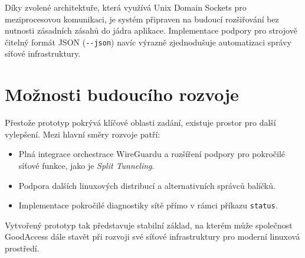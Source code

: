 Díky zvolené architektuře, která využívá Unix Domain Sockets pro meziprocesovou komunikaci, je systém připraven na budoucí rozšiřování bez nutnosti zásadních zásahů do jádra aplikace. Implementace podpory pro strojově čitelný formát JSON (\texttt{-{}-json}) navíc výrazně zjednodušuje automatizaci správy síťové infrastruktury.

\section*{Možnosti budoucího rozvoje}

Přestože prototyp pokrývá klíčové oblasti zadání, existuje prostor pro další vylepšení. Mezi hlavní směry rozvoje patří:
\begin{itemize}
    \item Plná integrace orchestrace WireGuardu a rozšíření podpory pro pokročilé síťové funkce, jako je \textit{Split Tunneling}.
    \item Podpora dalších linuxových distribucí a alternativních správců balíčků.
    \item Implementace pokročilé diagnostiky sítě přímo v rámci příkazu \texttt{status}.
\end{itemize}

Vytvořený prototyp tak představuje stabilní základ, na kterém může společnost GoodAccess dále stavět při rozvoji své síťové infrastruktury pro moderní linuxová prostředí.
